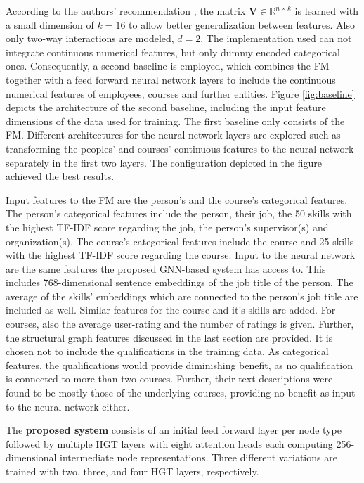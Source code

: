 According to the authors' recommendation \parencite{rendle2010factorization}, the matrix $\mathbf{V} \in \mathbb{R}^{n \times k}$ is learned with a small dimension of $k=16$ to allow better generalization between features. Also only two-way interactions are modeled, $d=2$. The implementation used \parencite{torchfm} can not integrate continuous numerical features, but only dummy encoded categorical ones. Consequently, a second baseline is employed, which combines the FM together with a feed forward neural network layers \parencite{rosenblatt1958perceptron} to include the continuous numerical features of employees, courses and further entities. Figure \ref{fig:baseline} depicts the architecture of the second baseline, including the input feature dimensions of the data used for training. The first baseline only consists of the FM. Different architectures for the neural network layers are explored such as transforming the peoples' and courses' continuous features to the neural network separately in the first two layers. The configuration depicted in the figure achieved the best results.  

Input features to the FM are the person's and the course's categorical features.  The person's categorical features include the person, their job, the 50 skills with the highest TF-IDF score regarding the job, the person's supervisor(s) and organization(s). The course's categorical features include the course and 25 skills with the highest TF-IDF score regarding the course. Input to the neural network are the same features the proposed GNN-based system has access to. This includes 768-dimensional sentence embeddings \parencite{song2020mpnet} \parencite{sbertmodel2} of the job title of the person. The average of the skills' embeddings which are connected to the person's job title are included as well. Similar features for the course and it's skills are added. For courses, also the average user-rating and the number of ratings is given.  Further, the structural graph features discussed in the last section are provided. It is chosen not to include the qualifications in the training data. As categorical features, the qualifications would provide diminishing benefit, as no qualification is connected to more than two courses. Further, their text descriptions were found to be mostly those of the underlying courses, providing no benefit as input to the neural network either. 

The \textbf{proposed system} consists of an initial feed forward layer per node type followed by multiple HGT layers with eight attention heads each\parencite{hu2020heterogeneous} \parencite{pyg} computing 256-dimensional intermediate node representations. Three different variations are trained with two, three, and four HGT layers, respectively. 


